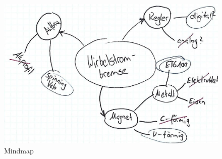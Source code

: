

\begin{figure}[ht]
    \begin{center}
      \includegraphics[width=12cm]{assets/images/planung}
    \end{center}
    \vspace{-3ex}
    \caption{Mindmap}
    \label{fig:mindmap}
  \end{figure}